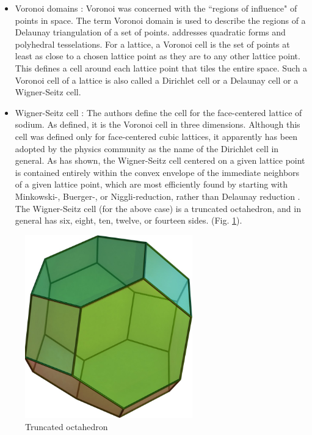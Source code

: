 \documentclass[preprint]{iucr}              %
\numberwithin{equation}{section}
\begin{document}
\begin{itemize}
\item{Voronoi domains \cite{Voronoi1908nouvelles}: 	Voronoi was concerned with the ``regions of influence" of points in
	space. The term Voronoi domain is used to describe the regions
	of a Delaunay triangulation of a set of points. 
	addresses quadratic forms and polyhedral tesselations.
	For a lattice, a Voronoi cell is the set of points
	at least as close to a chosen lattice point as they
	are to any other lattice point.  This defines a
	cell around each lattice point that tiles the entire
	space.  Such a Voronoi cell of a lattice is also
	called a Dirichlet cell or a Delaunay cell or a
	Wigner-Seitz cell.}
	
\item{Wigner-Seitz cell \cite{Wigner1933constitution}:	The authors define the cell for the face-centered lattice of sodium.
	As defined, it is the Voronoi cell  in three dimensions. Although 
	this cell was defined only for face-centered cubic lattices,
	it apparently has been adopted by the physics community as the
	name of the Dirichlet cell in general.  As  has shown, the
Wigner-Seitz cell centered on a given lattice point is contained entirely within the convex envelope of the immediate 
neighbors of a given lattice point, which are most efficiently
found by starting with Minkowski-, Buerger-, or Niggli-reduction, rather than Delaunay reduction \cite{bernstein2023invertible}.  The Wigner-Seitz cell (for the above case) is a truncated octahedron, and in general has six, eight, ten, twelve, or fourteen sides.
	(Fig. \ref{fig:octa}).
}
\end{itemize}

\begin{figure}
	\label{fig:octa}
	\caption{Truncated octahedron \cite{wikipeditrancatedoctahedron}}
	\includegraphics[width=7.25cm]{Truncatedoctahedron}
\end{figure}
\end{document}
